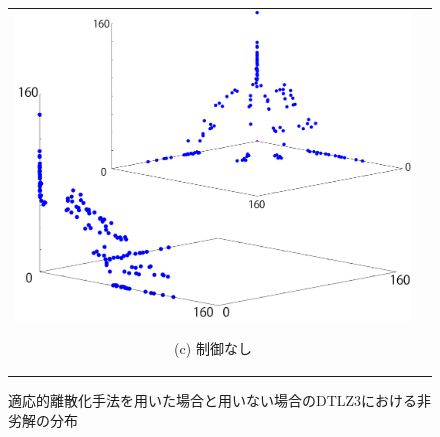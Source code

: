 \documentclass[../main/main]{subfiles}
\begin{document}
\begin{figure}[htbp]
\begin{tabular}{cc}
\begin{minipage}{0.33\hsize}
\includegraphics[width=1\linewidth]{../figures/dtlz3_uc_double.pdf}
\begin{center}
{\footnotesize (c) 制御なし}
\end{center}
\end{minipage}
\end{tabular}
\caption{適応的離散化手法を用いた場合と用いない場合のDTLZ3における非劣解の分布}
\label{fig:nondoms}
\end{figure}
\end{document}
